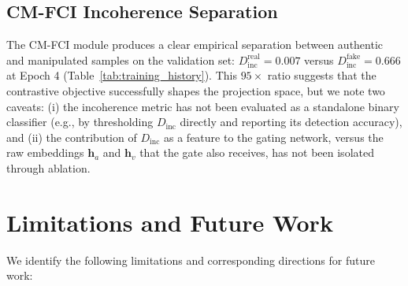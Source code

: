 \documentclass[conference]{IEEEtran}
\begin{document}
\subsection{CM-FCI Incoherence Separation}

The CM-FCI module produces a clear empirical separation between authentic and manipulated samples on the validation set: $D_{\mathrm{inc}}^{\mathrm{real}} = 0.007$ versus $D_{\mathrm{inc}}^{\mathrm{fake}} = 0.666$ at Epoch 4 (Table~\ref{tab:training_history}). This $95\times$ ratio suggests that the contrastive objective successfully shapes the projection space, but we note two caveats: (i) the incoherence metric has not been evaluated as a standalone binary classifier (e.g., by thresholding $D_{\mathrm{inc}}$ directly and reporting its detection accuracy), and (ii) the contribution of $D_{\mathrm{inc}}$ as a feature to the gating network, versus the raw embeddings $\mathbf{h}_a$ and $\mathbf{h}_v$ that the gate also receives, has not been isolated through ablation.

\section{Limitations and Future Work}
\label{sec:limitations}

We identify the following limitations and corresponding directions for future work:
\end{document}
